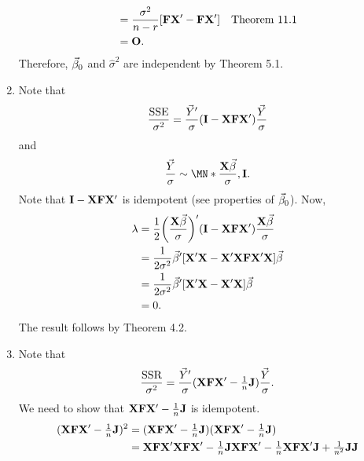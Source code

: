\begin{Theorem}{}{}
\begin{enumerate}[(1)]
\begin{align*}
                   & =\frac{\sigma^2}{n-r}[\mathbf{F}\mathbf{X}'-\mathbf{F}\mathbf{X}']                                &  & \text{Theorem 11.1} \\
                   & =\mathbf{O}.
              \end{align*}
              Therefore, $ \vec{\beta}_0 $ and  $ \hat{\sigma}^2 $ are independent by Theorem 5.1.
        \item Note that
              \[ \frac{\text{SSE}}{\sigma^2}=\frac{\vec{Y}'}{\sigma}(\mathbf{I}-\mathbf{X}\mathbf{F}\mathbf{X}')\frac{\vec{Y}}{\sigma} \]
              and
              \[ \frac{\Vector{Y}}{\sigma}\sim \MN*{\frac{\Matrix{X}\Vector{\beta}}{\sigma},\Matrix{I}}. \]
              Note that $ \mathbf{I}-\mathbf{X}\mathbf{F}\mathbf{X}' $ is idempotent (see properties of $ \vec{\beta}_0 $).
              Now,
              \begin{align*}
                  \lambda
                   & =\frac{1}{2}\biggl(\frac{\mathbf{X}\vec{\beta}}{\sigma}\biggr)'(\mathbf{I}-\mathbf{X}\mathbf{F}\mathbf{X}')\frac{\mathbf{X}\vec{\beta}}{\sigma} \\
                   & =\frac{1}{2\sigma^2}\vec{\beta}'[\mathbf{X}'\mathbf{X}-\mathbf{X}'\mathbf{X}\mathbf{F}\mathbf{X}'\mathbf{X}]\vec{\beta}                         \\
                   & =\frac{1}{2\sigma^2}\vec{\beta}'[\mathbf{X}'\mathbf{X}-\mathbf{X}'\mathbf{X}]\vec{\beta}                                                        \\
                   & =0.
              \end{align*}
              The result follows by Theorem 4.2.
        \item Note that
              \[ \frac{\text{SSR}}{\sigma^2}=\frac{\vec{Y}'}{\sigma}(\mathbf{X}\mathbf{F}\mathbf{X}'-\tfrac{1}{n}\mathbf{J})\frac{\vec{Y}}{\sigma}. \]
              We need to show that $ \mathbf{X}\mathbf{F}\mathbf{X}'-\tfrac{1}{n}\mathbf{J} $ is idempotent.
              \begin{align*}
                  (\Matrix{X}\Matrix{F}\Matrix{X}'-\tfrac{1}{n}\Matrix{J})^2
                   & =(\Matrix{X}\Matrix{F}\Matrix{X}'-\tfrac{1}{n}\Matrix{J})(\Matrix{X}\Matrix{F}\Matrix{X}'-\tfrac{1}{n}\Matrix{J})                                                                                              \\
                   & =\Matrix{X}\Matrix{F}\Matrix{X}'\Matrix{X}\Matrix{F}\Matrix{X}'-\tfrac{1}{n}\Matrix{J}\Matrix{X}\Matrix{F}\Matrix{X}'-\tfrac{1}{n}\Matrix{X}\Matrix{F}\Matrix{X}'\Matrix{J}+\tfrac{1}{n^2}\Matrix{J}\Matrix{J} \\

\end{align*}
\end{enumerate}
\end{Theorem}
